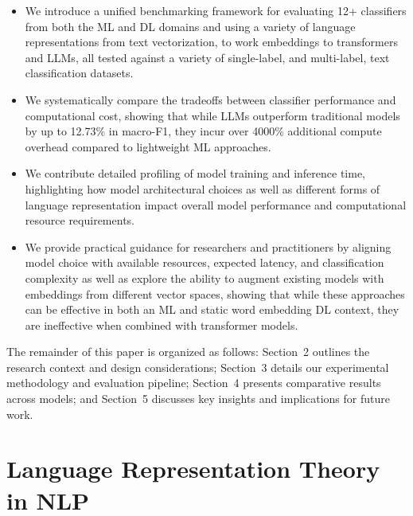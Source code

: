 \documentclass[final]{clv2025}
\begin{document}
\begin{itemize}
    \item We introduce a unified benchmarking framework for evaluating 12+ classifiers from both the ML and DL domains and using a variety of language representations from text vectorization, to work embeddings to transformers and LLMs, all tested against a variety of single-label, and multi-label, text classification datasets.
    \item We systematically compare the tradeoffs between classifier performance and computational cost, showing that while LLMs outperform traditional models by up to 12.73\% in macro-F1, they incur over 4000\% additional compute overhead compared to lightweight ML approaches.
    \item We contribute detailed profiling of model training and inference time, highlighting how model architectural choices as well as different forms of language representation impact overall model performance and computational resource requirements.
    \item We provide practical guidance for researchers and practitioners by aligning model choice with available resources, expected latency, and classification complexity as well as explore the ability to augment existing models with embeddings from different vector spaces, showing that while these approaches can be effective in both an ML and static word embedding DL context, they are ineffective when combined with transformer models.
\end{itemize}

The remainder of this paper is organized as follows: Section~2 outlines the research context and design considerations; Section~3 details our experimental methodology and evaluation pipeline; Section~4 presents comparative results across models; and Section~5 discusses key insights and implications for future work.


\section{Language Representation Theory in NLP}
\end{document}
